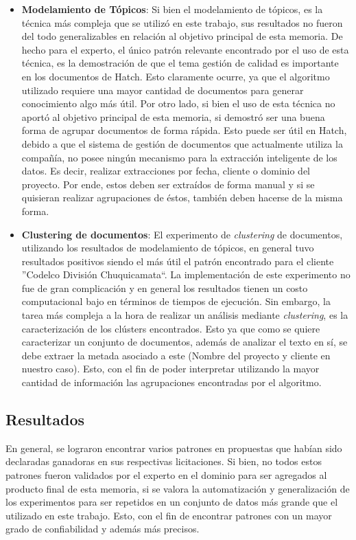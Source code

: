 \begin{itemize}
        \item \textbf{Modelamiento de Tópicos}: Si bien el modelamiento de tópicos, es la técnica más compleja que se utilizó en este trabajo, sus resultados no fueron del todo generalizables en relación al objetivo principal de esta memoria. De hecho para el experto, el único patrón relevante encontrado por el uso de esta técnica, es la demostración de que el tema gestión de calidad es importante en los documentos de Hatch. Esto claramente ocurre, ya que el algoritmo utilizado requiere una mayor cantidad de documentos para generar conocimiento algo más útil. Por otro lado, si bien el uso de esta técnica no aportó al objetivo principal de esta memoria, si demostró ser una buena forma de agrupar documentos de forma rápida. Esto puede ser útil en Hatch, debido a que el sistema de gestión de documentos que actualmente utiliza la compañía, no posee ningún mecanismo para la extracción inteligente de los datos. Es decir, realizar extracciones por fecha, cliente o dominio del proyecto. Por ende, estos deben ser extraídos de forma manual y si se quisieran realizar agrupaciones de éstos, también deben hacerse de la misma forma.
        
        \item \textbf{Clustering de documentos}: El experimento de \textit{clustering} de documentos, utilizando los resultados de modelamiento de tópicos, en general tuvo resultados positivos siendo el más útil el patrón encontrado para el cliente ''Codelco División Chuquicamata``. La implementación de este experimento no fue de gran complicación y en general los resultados tienen un costo computacional bajo en términos de tiempos de ejecución. Sin embargo, la tarea más compleja a la hora de realizar un análisis mediante \textit{clustering}, es la caracterización de los clústers encontrados. Esto ya que como se quiere caracterizar un conjunto de documentos, además de analizar el texto en sí, se debe extraer la metada asociado a este (Nombre del proyecto y cliente en nuestro caso). Esto, con el fin de poder interpretar utilizando la mayor cantidad de información las agrupaciones encontradas por el algoritmo.
    \end{itemize}

\subsection{Resultados}
    En general, se lograron encontrar varios patrones en propuestas que habían sido declaradas ganadoras en sus respectivas licitaciones. Si bien, no todos estos patrones fueron validados por el experto en el dominio para ser agregados al producto final de esta memoria, si se valora la automatización y generalización de los experimentos para ser repetidos en un conjunto de datos más grande que el utilizado en este trabajo. Esto, con el fin de encontrar patrones con un mayor grado de confiabilidad y además más precisos.
    
